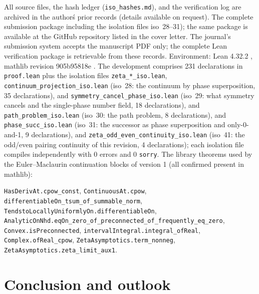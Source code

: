\documentclass{article}
\begin{document}
All source files, the hash ledger (\texttt{iso\_hashes.md}), and the
verification log are archived in the author\'s prior records (details available on request). The complete submission package
including the isolation files iso~28--31); the same package is
available at the GitHub repository listed in the cover letter. The
journal's submission system accepts the manuscript PDF only; the
complete Lean verification package is retrievable from these records.
Environment: Lean 4.32.2 \cite{lean}, mathlib revision 905b95818e
\cite{mathlib}. The development
comprises 231 declarations in \texttt{proof.lean} plus the isolation files
\texttt{zeta\_*\_iso.lean}, \texttt{continuum\_projection\_iso.lean}
(iso~28: the continuum by phase superposition, 35 declarations), and
\texttt{symmetry\_cancel\_phase\_iso.lean} (iso~29: what symmetry cancels
and the single-phase number field, 18 declarations), and
\texttt{path\_problem\_iso.lean} (iso~30: the path problem, 8
declarations), and \texttt{phase\_succ\_iso.lean} (iso~31: the
successor as phase superposition and only-0-and-1, 9 declarations), and
\texttt{zeta\_odd\_even\_continuity\_iso.lean} (iso~41: the odd/even
pairing continuity of this revision, 4 declarations); each isolation file
compiles independently with
0 errors and 0 \texttt{sorry}. The library theorems used by the Euler--Maclaurin
continuation blocks of version 1 (all confirmed present in mathlib):
{\small\begin{sloppypar}\texttt{HasDerivAt.cpow\_const},
\texttt{ContinuousAt.cpow}, \texttt{differentiableOn\_tsum\_of\_summable\_norm},
\texttt{TendstoLocallyUniformlyOn.differentiableOn},
\texttt{AnalyticOnNhd.eqOn\_zero\_of\_preconnected\_of\_frequently\_eq\_zero},
\texttt{Convex.isPreconnected}, \texttt{intervalIntegral.integral\_ofReal},
\texttt{Complex.ofReal\_cpow}, \texttt{ZetaAsymptotics.term\_nonneg},
\texttt{ZetaAsymptotics.zeta\_limit\_aux1}.\end{sloppypar}}

\section{Conclusion and outlook}
\label{sec:conclusion}
\end{document}
